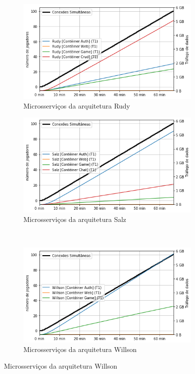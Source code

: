 \begin{figure}[htb!]
    \caption{Entrada de dados da rede de microsserviços}
    \label{fig:experimento_gs_net_in}

    \begin{subfigure}{0.5\textwidth}
        \centering
        \includegraphics[width=.95\linewidth]{figuras/analise/rt/r_net_in_arch.png}
        \caption{Microsserviços da arquitetura Rudy}
        \label{fig:r_netin_gs}
    \end{subfigure}%
    \begin{subfigure}{0.5\textwidth}
        \centering
        \includegraphics[width=.95\linewidth]{figuras/analise/rt/s_net_in_arch.png}
        \caption{Microsserviços da arquitetura Salz}
        \label{fig:s_netin_gs}
    \end{subfigure}\\

    \begin{subfigure}{0.5\textwidth}
        \centering
        \includegraphics[width=.95\linewidth]{figuras/analise/rt/w_net_in_arch.png}
        \caption{Microsserviços da arquitetura Willson}
        \label{fig:w_netin_gs}
    \end{subfigure}


\end{figure}
